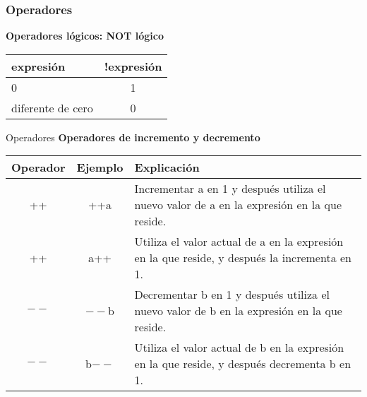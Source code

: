 \begin{frame}[t]
\frametitle{Operadores}
\textbf{Operadores lógicos: NOT lógico}\\ \vspace{5mm}
\centering
\begin{tabular}{lc}
\toprule
\textbf{expresión} & \textbf{!expresión}\\
\midrule \hline
0 & 1 \\
diferente de cero & 0\\
\bottomrule
\end{tabular}
\end{frame}

\begin{frame}[t]{Operadores}
\textbf{Operadores de incremento y decremento}\\ \vspace{5mm}
\footnotesize
\begin{center}
\begin{tabular}{ccp{7.5cm}}
	\toprule
	\textbf{Operador} & \textbf{Ejemplo} & \textbf{Explicación}\\
	\midrule
	++&++a& Incrementar a en 1 y después utiliza el nuevo valor de a en la expresión en la que reside.\\
	++ & a++ & Utiliza el valor actual de a en la expresión en la que reside, y después la incrementa en 1.\\
	$--$ & $--$b & Decrementar b en 1 y después utiliza el nuevo valor de b en la expresión en la que reside.\\
	$--$ & b$--$ & Utiliza el valor actual de b en la expresión en la que reside, y después decrementa b en 1.\\
	\bottomrule
\end{tabular}
\end{center}
\end{frame}


